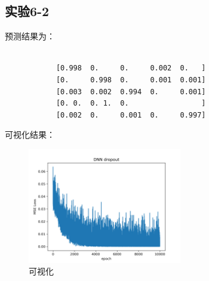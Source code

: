 \documentclass{../source/Experiment}
\begin{document}
        \subsection{实验6-2}
            预测结果为：
            \begin{lstlisting}

            [0.998  0.     0.     0.002  0.   ]
            [0.     0.998  0.     0.001  0.001]
            [0.003  0.002  0.994  0.     0.001]
            [0. 0.  0. 1.  0.                 ]
            [0.002  0.     0.001  0.     0.997]

            \end{lstlisting}
            可视化结果：
            \begin{figure}[H]
                \centering
                \includegraphics[width = 0.6\textwidth]{Part6/6_2.png}
                \caption{可视化}
            \end{figure}
\end{document}
